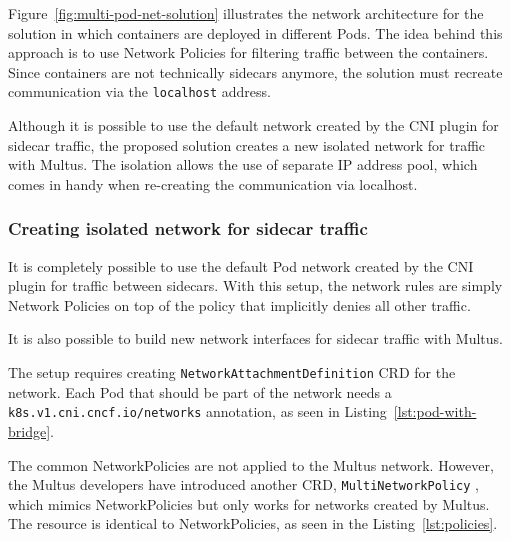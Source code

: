 \documentclass[english, 12pt, a4paper, sci, utf8, a-2b, online]{aaltothesis}
\begin{document}
Figure~\ref{fig:multi-pod-net-solution} illustrates the network architecture for the solution in which containers are deployed in different Pods.
The idea behind this approach is to use Network Policies for filtering traffic between the containers.
Since containers are not technically sidecars anymore, the solution must recreate communication via the \texttt{localhost} address.

Although it is possible to use the default network created by the CNI plugin for sidecar traffic, the proposed solution creates a new isolated network for traffic with Multus.
The isolation allows the use of separate IP address pool, which comes in handy when re-creating the communication via localhost.

\subsubsection{Creating isolated network for sidecar traffic}

It is completely possible to use the default Pod network created by the CNI plugin for traffic between sidecars.
With this setup, the network rules are simply Network Policies on top of the policy that implicitly denies all other traffic.

It is also possible to build new network interfaces for sidecar traffic with Multus.



The setup requires creating \texttt{NetworkAttachmentDefinition} CRD for the network.
Each Pod that should be part of the network needs a \texttt{k8s.v1.cni.cncf.io/networks} annotation, as seen in Listing~\ref{lst:pod-with-bridge}.



The common NetworkPolicies are not applied to the Multus network.
However, the Multus developers have introduced another CRD, \texttt{MultiNetworkPolicy} \cite{multi-network-policy}, which mimics NetworkPolicies but only works for networks created by Multus.
The resource is identical to NetworkPolicies, as seen in the Listing~\ref{lst:policies}.


\end{document}
